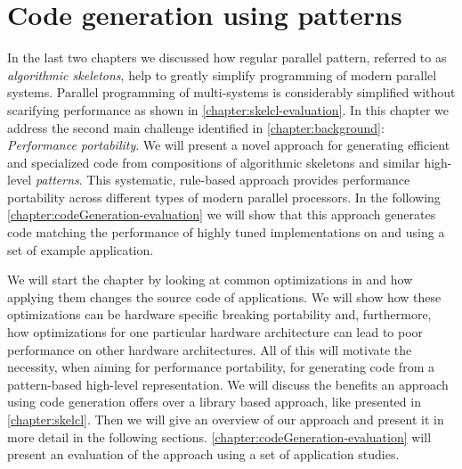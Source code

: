 
\chapter{Code generation using patterns}

\label{ch:fifth} %
\label{chapter:codeGeneration}

In the last two chapters we discussed how regular parallel pattern, referred to as \emph{algorithmic skeletons}, help to greatly simplify programming of modern parallel systems.
Parallel programming of multi-\GPU systems is considerably simplified without scarifying performance as shown in \autoref{chapter:skelcl-evaluation}.
In this chapter we address the second main challenge identified in \autoref{chapter:background}: \emph{Performance portability}.
We will present a novel approach for generating efficient and specialized code from compositions of algorithmic skeletons and similar high-level \emph{patterns}.
This systematic, rule-based approach provides performance portability across different types of modern parallel processors. 
In the following \autoref{chapter:codeGeneration-evaluation} we will show that this approach generates code matching the performance of highly tuned implementations on \CPUs and \GPUs using a set of example application.

We will start the chapter by looking at common optimizations in \OpenCL and how applying them changes the source code of applications.
We will show how these optimizations can be hardware specific breaking portability and, furthermore, how optimizations for one particular hardware architecture can lead to poor performance on other hardware architectures.
All of this will motivate the necessity, when aiming for performance portability, for generating code from a pattern-based high-level representation.
We will discuss the benefits an approach using code generation offers over a library based approach, like \SkelCL presented in \autoref{chapter:skelcl}.
Then we will give an overview of our approach and present it in more detail in the following sections.
\autoref{chapter:codeGeneration-evaluation} will present an evaluation of the approach using a set of application studies.







